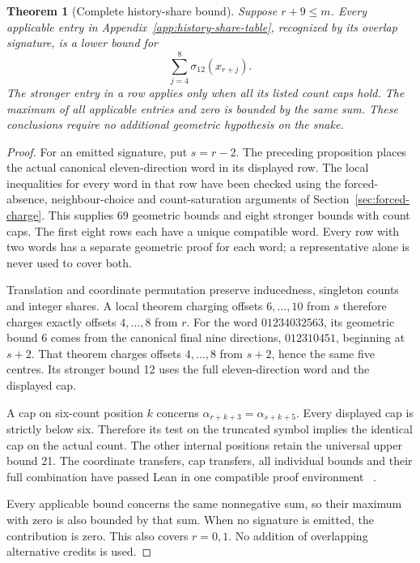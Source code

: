 \documentclass[11pt,a4paper]{article}
\newtheorem{theorem}{Theorem}[section]
\theoremstyle{definition}
\theoremstyle{remark}
\begin{document}
\begin{theorem}[Complete history-share bound]\label{thm:history-share-complete}
Suppose $r+9\le m$. Every applicable entry in
Appendix~\ref{app:history-share-table}, recognized by its overlap signature,
is a lower bound for
\[
\sum_{j=4}^{8}\sigma_{12}(x_{r+j}).
\]
The stronger entry in a row applies only when all its listed count caps hold.
The maximum of all applicable entries and zero is bounded by the same sum.
These conclusions require no additional geometric hypothesis on the snake.
\end{theorem}
\begin{proof}
For an emitted signature, put $s=r-2$. The preceding proposition places the
actual canonical eleven-direction word in its displayed row. The local
inequalities for every word in that row have been checked using the
forced-absence, neighbour-choice and count-saturation arguments of
Section~\ref{sec:forced-charge}. This supplies 69 geometric bounds and eight
stronger bounds with count caps. The first eight rows each have a unique
compatible word. Every row with two words has a separate geometric proof
for each word; a representative alone is never used to cover both.

Translation and coordinate permutation preserve inducedness, singleton
counts and integer shares. A local theorem charging offsets $6,\ldots,10$
from $s$ therefore charges exactly offsets $4,\ldots,8$ from $r$.
For the word $01234032563$, its geometric bound 6 comes from the canonical
final nine directions, $012310451$, beginning at $s+2$. That theorem charges
offsets $4,\ldots,8$ from $s+2$, hence the same five centres. Its stronger
bound 12 uses the full eleven-direction word and the displayed cap.

A cap on six-count position $k$ concerns $\alpha_{r+k+3}=
\alpha_{s+k+5}$. Every displayed cap is strictly below six. Therefore its
test on the truncated symbol implies the identical cap on the actual count.
The other internal positions retain the universal upper bound 21. The
coordinate transfers, cap transfers, all individual bounds and their full
combination have passed Lean in one compatible proof environment
~\cite{historycreditarchive}.

Every applicable bound concerns the same nonnegative sum, so their maximum
with zero is also bounded by that sum. When no signature is emitted, the
contribution is zero. This also covers $r=0,1$. No addition of overlapping
alternative credits is used.
\end{proof}
\end{document}
